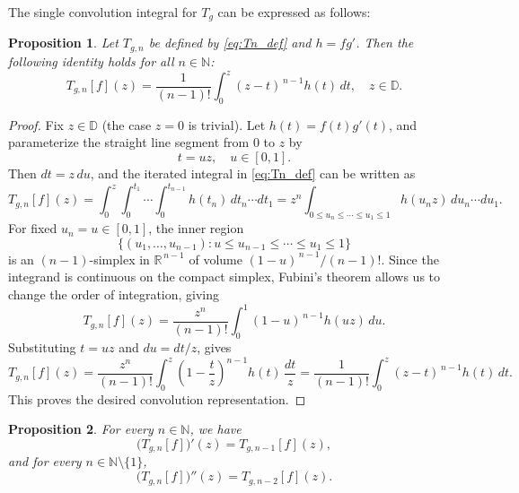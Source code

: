 \documentclass[12pt,a4paper]{amsart}
\numberwithin{equation}{section}
\newtheorem{proposition}{Proposition}[section]
\theoremstyle{remark}
\begin{document}
The single convolution integral for \( T_g \) can be expressed as follows:


\begin{proposition}\label{prop:iterated-convolution}
Let $T_{g,n}$ be defined by \eqref{eq:Tn_def} and $h=fg'$. Then the following identity holds for all $n\in\mathbb N$:
\begin{equation*}\label{eq:iterated-to-convolution}
T_{g,n}[f](z)=\frac{1}{(n-1)!}\int_{0}^{z}(z-t)^{\,n-1}h(t)\,dt,\quad z\in\mathbb{D}.
\end{equation*}
\end{proposition}

\begin{proof}
Fix \(z\in\mathbb{D}\) (the case \(z=0\) is trivial).  
Let \(h(t)=f(t)g'(t)\), and parameterize the straight line segment from \(0\) to \(z\) by
\[
t=u z,\quad u\in[0,1].
\]
Then \(dt=z\,du\), and the iterated integral in \eqref{eq:Tn_def} can be written as
\[
T_{g,n}[f](z)
 = \int_{0}^{z}\int_{0}^{t_1}\!\cdots\!\int_{0}^{t_{n-1}} h(t_n)\,dt_n\cdots dt_1
 = z^n \!\!\int_{0\le u_n\le\cdots\le u_1\le1} h(u_n z)\,du_n\cdots du_1.
\]
For fixed \(u_n=u\in[0,1]\), the inner region
\[
\{(u_1,\dots,u_{n-1}) : u\le u_{n-1}\le\cdots\le u_1\le1\}
\]
is an \((n-1)\)-simplex in \(\mathbb{R}^{\,n-1}\) of volume \((1-u)^{\,n-1}/(n-1)!\).
Since the integrand is continuous on the compact simplex, Fubini's theorem allows us to change the order of integration, giving
\[
T_{g,n}[f](z)
= \frac{z^n}{(n-1)!}\int_{0}^{1} (1-u)^{\,n-1} h(u z)\,du.
\]
Substituting \(t=u z\) and \(du = dt/z\), gives
\[
T_{g,n}[f](z)
 = \frac{z^n}{(n-1)!}\int_{0}^{z}\!\!\left(1-\frac{t}{z}\right)^{\!n-1} h(t)\,\frac{dt}{z}
 = \frac{1}{(n-1)!}\int_{0}^{z} (z-t)^{\,n-1} h(t)\,dt.
\]
This proves the desired convolution representation.
\end{proof}


\begin{proposition}\label{prop:Tn_derivatives}
 For every $n\in\mathbb{N}$, we have
\begin{equation*}
\big(T_{g,n}[f]\big)'(z)=T_{g,n-1}[f](z),
\end{equation*}
and for every $n\in\mathbb{N}\setminus\{1\}$,
\begin{equation*}
\big(T_{g,n}[f]\big)''(z)=T_{g,n-2}[f](z).
\end{equation*}
\end{proposition}
\end{document}
